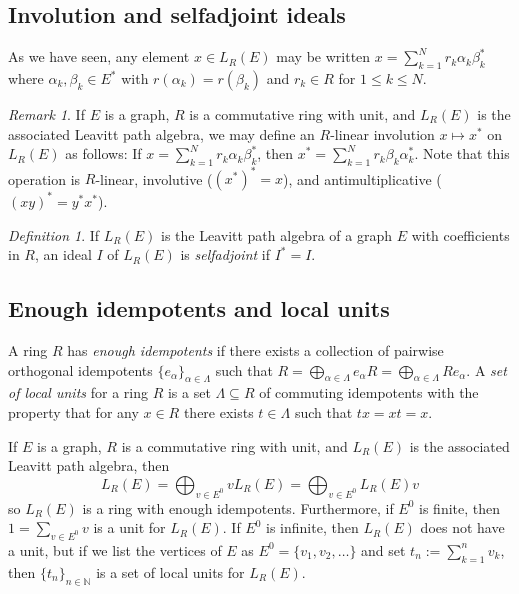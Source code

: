 \documentclass[11pt]{amsart}
\theoremstyle{remark}
\newtheorem{remark}[theorem]{Remark}
\newtheorem{definition}[theorem]{Definition}
\numberwithin{equation}{section}
\newcommand{\N}{\mathbb{N}}
\begin{document}
\subsection{Involution and selfadjoint ideals}

As we have seen, any element $x \in L_R(E)$ may be written $x = \sum_{k=1}^N r_k \alpha_k \beta_k^*$ where $\alpha_k, \beta_k \in E^*$ with $r(\alpha_k) = r(\beta_k)$ and $r_k \in R$ for $1 \leq k \leq N$.


\begin{remark}
If $E$ is a graph, $R$ is a commutative ring with unit, and $L_R(E)$ is the associated Leavitt path algebra, we may define an $R$-linear involution $x \mapsto x^*$ on $L_R(E)$ as follows:  If $x = \sum_{k=1}^N r_k \alpha_k \beta_k^*$, then $x^* = \sum_{k=1}^N r_k \beta_k \alpha_k^*$.  Note that this operation is $R$-linear, involutive ($(x^*)^* = x$), and antimultiplicative ($(xy)^* = y^*x^*$).
\end{remark}

\begin{definition}
If $L_R(E)$ is the Leavitt path algebra of a graph $E$ with coefficients in $R$, an ideal $I$ of $L_R(E)$ is \emph{selfadjoint} if $I^* = I$.
\end{definition}


\subsection{Enough idempotents and local units}

A ring $R$ has \emph{enough idempotents} if there exists a collection of pairwise orthogonal idempotents $\{ e_\alpha \}_{\alpha \in \Lambda}$ such that $R = \bigoplus_{\alpha \in \Lambda} e_\alpha R = \bigoplus_{\alpha \in \Lambda} R e_\alpha$.  A \emph{set of local units} for a ring $R$ is a set $\Lambda \subseteq R$ of commuting idempotents with the property that for any $x \in R$ there exists $t \in \Lambda$ such that $tx=xt=x$.  

If $E$ is a graph, $R$ is a commutative ring with unit, and $L_R(E)$ is the associated Leavitt path algebra, then $$L_R(E) = \bigoplus_{v \in E^0} v L_R(E) = \bigoplus_{v \in E^0} L_R(E) v$$ so $L_R(E)$ is a ring with enough idempotents.  Furthermore, if $E^0$ is finite, then $1=\sum_{v \in E^0} v$ is a unit for $L_R(E)$.  If $E^0$ is infinite, then $L_R(E)$ does not have a unit, but if we list the vertices of $E$ as $E^0 = \{v_1, v_2, \ldots \}$ and set $t_n := \sum_{k=1}^n v_k$, then $\{ t_n \}_{n \in \N}$ is a set of local units for $L_R(E)$.
\end{document}
